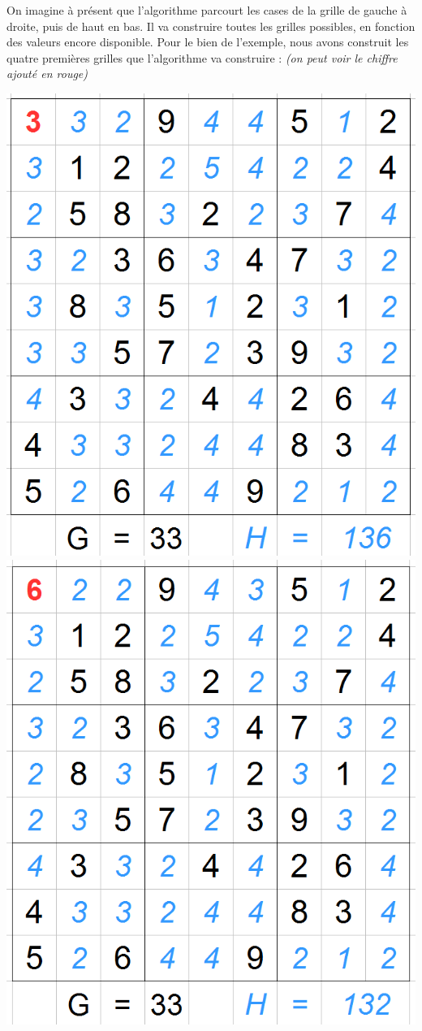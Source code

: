 On imagine à présent que l'algorithme parcourt les cases de la grille de gauche à droite, puis de haut en bas. Il va construire toutes les grilles possibles, en fonction des valeurs encore disponible. Pour le bien de l'exemple, nous avons construit les quatre premières grilles que l'algorithme va construire : \textit{(on peut voir le chiffre ajouté en rouge)}

\begin{center}
\includegraphics[scale=0.3]{images/AStarExample/1_1.png}
\includegraphics[scale=0.3]{images/AStarExample/1_2.png}


\end{center}
